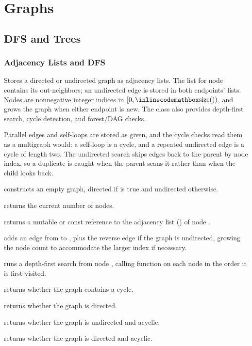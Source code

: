 \chapter{\texorpdfstring{Graphs}{4. Graphs}}

\section{\texorpdfstring{DFS and Trees}{4.1 DFS and Trees}}
\setcounter{section}{1}
\setcounter{subsection}{0}
\subsection{Adjacency Lists and DFS}
\label{sec:4.1.1}
Stores a directed or undirected graph as adjacency lists. The list for node  contains its out-neighbors; an undirected edge is stored in both endpoints' lists. Nodes are nonnegative integer indices in $[0, {\inlinecodemath{size()}})$, and  grows the graph when either endpoint is new. The class also provides depth-first search, cycle detection, and forest/DAG checks.

Parallel edges and self-loops are stored as given, and the cycle checks read them as a multigraph would: a self-loop is a cycle, and a repeated undirected edge is a cycle of length two. The undirected search skips edges back to the parent by node index, so a duplicate is caught when the parent scans it rather than when the child looks back.

\begin{compactitem}
  \item {} constructs an empty graph, directed if  is true and undirected otherwise.
  \item {} returns the current number of nodes.
  \item {} returns a mutable or const reference to the adjacency list () of node .
  \item {} adds an edge from  to , plus the reverse edge if the graph is undirected, growing the node count to accommodate the larger index if necessary.
  \item {} runs a depth-first search from node , calling function  on each node in the order it is first visited.
  \item {} returns whether the graph contains a cycle.
  \item {} returns whether the graph is directed.
  \item {} returns whether the graph is undirected and acyclic.
  \item {} returns whether the graph is directed and acyclic.
\end{compactitem}

